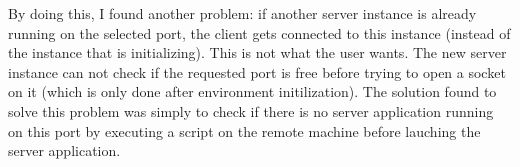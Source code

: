 By doing this, I found another problem: if another server instance is already
running on the selected port, the client gets connected to this instance
(instead of the instance that is initializing). This is not what the user
wants. The new server instance can not check if the requested port is free
before trying to open a socket on it (which is only done after environment
initilization). The solution found to solve this problem was simply to check if
there is no server application running on this port by executing a script on
the remote machine before lauching the server application.
